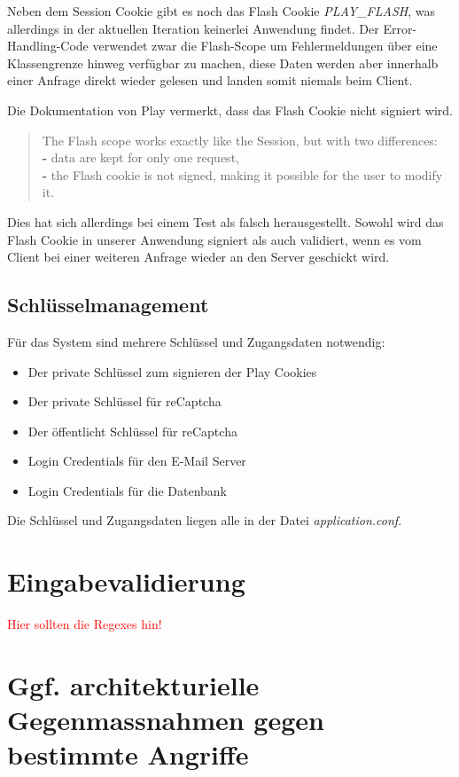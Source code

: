 \documentclass[12pt,DIV14,BCOR10mm,a4paper,parskip=half-,headsepline,headinclude,english,ngerman,bibliography=totocnumbered]{scrreprt}
\begin{document}
Neben dem Session Cookie gibt es noch das Flash Cookie \textit{PLAY\_FLASH}, was allerdings in der aktuellen Iteration keinerlei Anwendung findet. Der Error-Handling-Code verwendet zwar die Flash-Scope um Fehlermeldungen über eine Klassengrenze hinweg verfügbar zu machen, diese Daten werden aber innerhalb einer Anfrage direkt wieder gelesen und landen somit niemals beim Client.

Die Dokumentation von Play vermerkt, dass das Flash Cookie nicht signiert wird. \autocite{JavaPlayFlashDocu}
\blockquote{
The Flash scope works exactly like the Session, but with two differences: \\
\textbf{-} data are kept for only one request, \\
\textbf{-} the Flash cookie is not signed, making it possible for the user to modify it.
}
Dies hat sich allerdings bei einem Test als falsch herausgestellt. Sowohl wird das Flash Cookie in unserer Anwendung signiert als auch validiert, wenn es vom Client bei einer weiteren Anfrage wieder an den Server geschickt wird.

\subsection{Schlüsselmanagement}
Für das System sind mehrere Schlüssel und Zugangsdaten notwendig:

\begin{itemize}
	\item Der private Schlüssel zum signieren der Play Cookies
	\item Der private Schlüssel für reCaptcha
	\item Der öffentlicht Schlüssel für reCaptcha
	\item Login Credentials für den E-Mail Server
	\item Login Credentials für die Datenbank
\end{itemize}

Die Schlüssel und Zugangsdaten liegen alle in der Datei \textit{application.conf}.

\section{Eingabevalidierung}

\textcolor{red}{Hier sollten die Regexes hin!}

\section{Ggf. architekturielle Gegenmassnahmen gegen bestimmte Angriffe}
\end{document}
